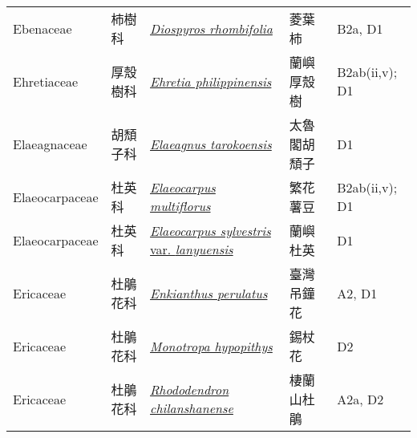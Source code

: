 {\begin{longtable}{L{2.5cm}L{2cm}L{5cm}L{2.5cm}L{3cm}}
    Ebenaceae & 柿樹科 & \href{http://www.theplantlist.org/tpl1.1/search?q=Diospyros+rhombifolia}{\textit{Diospyros rhombifolia} } & 菱葉柿 & B2a, D1    \\
    Ehretiaceae & 厚殼樹科 & \href{http://www.theplantlist.org/tpl1.1/search?q=Ehretia+philippinensis}{\textit{Ehretia philippinensis} } & 蘭嶼厚殼樹 & B2ab(ii,v); D1    \\
    Elaeagnaceae & 胡頹子科 & \href{http://www.theplantlist.org/tpl1.1/search?q=Elaeagnus+tarokoensis}{\textit{Elaeagnus tarokoensis} } & 太魯閣胡頹子 & D1    \\
    Elaeocarpaceae & 杜英科 & \href{http://www.theplantlist.org/tpl1.1/search?q=Elaeocarpus+multiflorus}{\textit{Elaeocarpus multiflorus} } & 繁花薯豆 & B2ab(ii,v); D1    \\
    Elaeocarpaceae & 杜英科 & \href{http://www.theplantlist.org/tpl1.1/search?q=Elaeocarpus+sylvestris+var.+lanyuensis}{\textit{Elaeocarpus sylvestris} var. \textit{lanyuensis} } & 蘭嶼杜英 & D1    \\
    Ericaceae & 杜鵑花科 & \href{http://www.theplantlist.org/tpl1.1/search?q=Enkianthus+perulatus}{\textit{Enkianthus perulatus} } & 臺灣吊鐘花 & A2, D1    \\
    Ericaceae & 杜鵑花科 & \href{http://www.theplantlist.org/tpl1.1/search?q=Monotropa+hypopithys}{\textit{Monotropa hypopithys} } & 錫杖花 & D2    \\
    Ericaceae & 杜鵑花科 & \href{http://www.theplantlist.org/tpl1.1/search?q=Rhododendron+chilanshanense}{\textit{Rhododendron chilanshanense} } & 棲蘭山杜鵑 & A2a, D2    \\

\end{longtable}}
